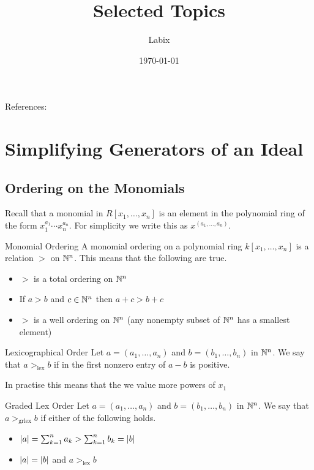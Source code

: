 \documentclass[a4paper]{article}
\title{Selected Topics}
\author{Labix}
\date{\today}
\begin{document}
\maketitle
\begin{abstract}
\end{abstract}

References: 
\pagebreak
\tableofcontents

\pagebreak
\section{Simplifying Generators of an Ideal}
\subsection{Ordering on the Monomials}
Recall that a monomial in $R[x_1,\dots,x_n]$ is an element in the polynomial ring of the form $x_1^{a_1}\cdots x_n^{a_n}$. For simplicity we write this as $x^{(a_1,\dots,a_n)}$. 

\begin{defn}{Monomial Ordering}{} A monomial ordering on a polynomial ring $k[x_1,\dots,x_n]$ is a relation $>$ on $\mathbb{N}^n$. This means that the following are true. 
\begin{itemize}
\item $>$ is a total ordering on $\mathbb{N}^n$
\item If $a>b$ and $c\in\mathbb{N}^n$ then $a+c>b+c$
\item $>$ is a well ordering on $\mathbb{N}^n$ (any nonempty subset of $\mathbb{N}^n$ has a smallest element)
\end{itemize}
\end{defn}

\begin{defn}{Lexicographical Order}{} Let $a=(a_1,\dots,a_n)$ and $b=(b_1,\dots,b_n)$ in $\mathbb{N}^n$. We say that $a>_{\text{lex}}b$ if in the first nonzero entry of $a-b$ is positive. 
\end{defn}

In practise this means that the we value more powers of $x_1$

\begin{defn}{Graded Lex Order}{} Let $a=(a_1,\dots,a_n)$ and $b=(b_1,\dots,b_n)$ in $\mathbb{N}^n$. We say that $a>_{\text{grlex}}b$ if either of the following holds. 
\begin{itemize}
\item $\abs{a}=\sum_{k=1}^na_k>\sum_{k=1}^nb_k=\abs{b}$
\item $\abs{a}=\abs{b}$ and $a>_{\text{lex}}b$
\end{itemize}
\end{defn}
\end{document}
